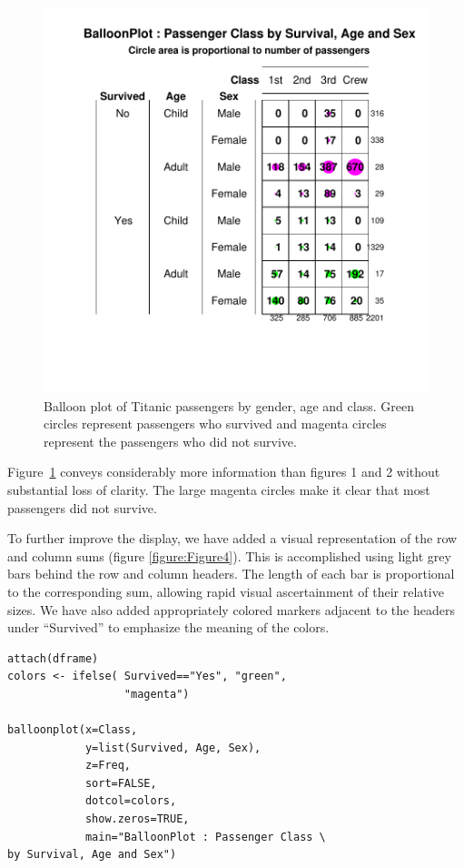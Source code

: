\documentclass[a4paper]{report}
\begin{document}
\begin{article}
\begin{figure}
\includegraphics[width=\textwidth]{Figure3.pdf}
\caption{\label{figure:Figure3}
  Balloon plot of Titanic passengers by gender, age and class. Green
  circles represent passengers who survived and magenta circles
  represent the passengers who did not survive.}
\end{figure}

Figure~\ref{figure:Figure3} conveys considerably more information than
figures 1 and 2 without substantial loss of clarity. The large magenta
circles make it clear that most passengers did not survive.

To further improve the display, we have added a visual
representation of the row and column sums (figure
\ref{figure:Figure4}).  This is accomplished using light grey bars
behind the row and column headers.  The length of each bar is
proportional to the corresponding sum, allowing rapid visual
ascertainment of their relative sizes.  We have also added
appropriately colored markers adjacent to the headers under
``Survived'' to emphasize the meaning of the colors.

{
\small
\begin{verbatim}
attach(dframe)
colors <- ifelse( Survived=="Yes", "green", 
                  "magenta")

balloonplot(x=Class,
            y=list(Survived, Age, Sex),
            z=Freq,
            sort=FALSE,
            dotcol=colors,
            show.zeros=TRUE,
            main="BalloonPlot : Passenger Class \
by Survival, Age and Sex")


\end{verbatim}}
\end{article}
\end{document}

